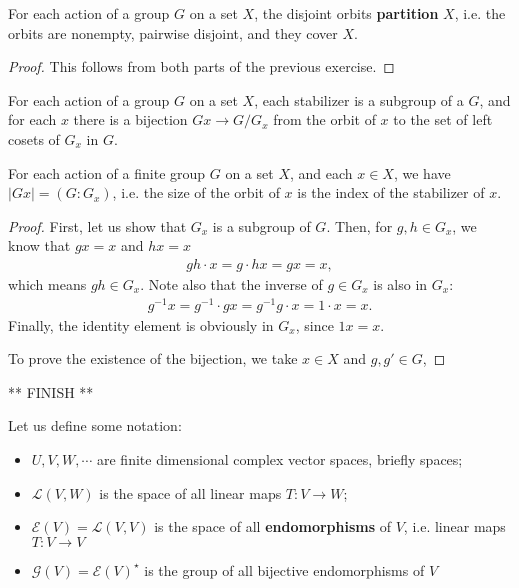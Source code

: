\documentclass{../mathnotes}
\begin{document}
\begin{thm}
    For each action of a group $G$ on a set $X$, the disjoint orbits \textbf{partition} $X$, i.e. the orbits are nonempty, pairwise disjoint, and they cover $X$.
\end{thm}
\begin{proof}
    This follows from both parts of the previous exercise.
\end{proof}

\begin{thm}
    For each action of a group $G$ on a set $X$, each stabilizer is a subgroup of a $G$, and for each $x$ there is a bijection $Gx\to G/G_x$ from the orbit
    of $x$ to the set of left cosets of $G_x$ in $G$.
\end{thm}
\begin{cor}
    For each action of a finite group $G$ on a set $X$, and each $x\in X$, we have $|Gx|=(G:G_x)$, i.e. the size of the orbit of $x$ is the index of the stabilizer
    of $x$.
\end{cor}
\begin{proof}
    First, let us show that $G_x$ is a subgroup of $G$. Then, for $g,h\in G_x$, we know that $gx=x$ and $hx=x$
    \begin{align*}
        gh\cdot x=g\cdot hx=gx=x,
    \end{align*}
    which means $gh\in G_x$. Note also that the inverse of $g\in G_x$ is also in $G_x$:
    \begin{align*}
        g^{-1}x=g^{-1}\cdot gx=g^{-1}g\cdot x=1\cdot x=x.
    \end{align*}
    Finally, the identity element is obviously in $G_x$, since $1x=x$.

    To prove the existence of the bijection, we take $x\in X$ and $g,g'\in G$,
\end{proof}

** FINISH **

Let us define some notation:
\begin{itemize}
    \item $U, V, W, \cdots$ are finite dimensional complex vector spaces, briefly spaces;
    \item $\mathcal{L}(V,W)$ is the space of all linear maps $T: V\to W$;
    \item $\mathcal{E}(V)=\mathcal{L}(V,V)$ is the space of all \textbf{endomorphisms} of $V$, i.e. linear maps $T:V\to V$
    \item $\mathcal{G}(V)=\mathcal{E}(V)^\star$ is the group of all bijective endomorphisms of $V$
\end{itemize}
\end{document}

